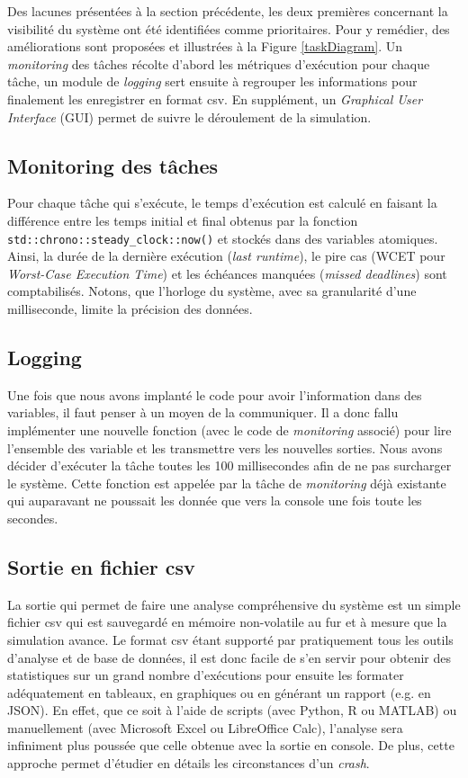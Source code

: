 \documentclass[journal]{IEEEtran}
\begin{document}
Des lacunes présentées à la section précédente, les deux premières concernant la visibilité du système ont été identifiées comme prioritaires. 
Pour y remédier, des améliorations sont proposées et illustrées à la Figure \ref{taskDiagram}. Un \textit{monitoring} des tâches récolte d'abord les métriques d'exécution pour chaque tâche, un module de \textit{logging} sert ensuite à regrouper les informations pour finalement les enregistrer en format csv. En supplément, un \textit{Graphical User Interface} (GUI) permet de suivre le déroulement de la simulation.

\subsection{Monitoring des tâches}

Pour chaque tâche qui s'exécute, le temps d'exécution est calculé en faisant la différence entre les temps initial et final obtenus par la fonction \verb|std::chrono::steady_clock::now()| et stockés dans des variables atomiques. Ainsi, la durée de la dernière exécution (\textit{last runtime}), le pire cas (WCET pour \textit{Worst-Case Execution Time}) et les échéances manquées (\textit{missed deadlines}) sont comptabilisés. Notons, que l'horloge du système, avec sa granularité d'une milliseconde, limite la précision des données.

\subsection{Logging}

Une fois que nous avons implanté le code pour avoir l'information dans des variables, il faut penser à un moyen de la communiquer. Il a donc fallu implémenter une nouvelle fonction (avec le code de \textit{monitoring} associé) pour lire l'ensemble des variable et les transmettre vers les nouvelles sorties. Nous avons décider d'exécuter la tâche toutes les 100 millisecondes afin de ne pas surcharger le système. Cette fonction est appelée par la tâche de \textit{monitoring} déjà existante qui auparavant ne poussait les donnée que vers la console une fois toute les secondes.

\subsection{Sortie en fichier csv}

La sortie qui permet de faire une analyse compréhensive du système est un simple fichier csv qui est sauvegardé en mémoire non-volatile au fur et à mesure que la simulation avance. Le format csv étant supporté par pratiquement tous les outils d'analyse et de base de données, il est donc facile de s'en servir pour obtenir des statistiques sur un grand nombre d'exécutions pour ensuite les formater adéquatement en tableaux, en graphiques ou en générant un rapport (e.g. en JSON). En effet, que ce soit à l'aide de scripts (avec Python, R ou MATLAB) ou manuellement (avec Microsoft Excel ou LibreOffice Calc), l'analyse sera infiniment plus poussée que celle obtenue avec la sortie en console. De plus, cette approche permet d'étudier en détails les circonstances d'un \textit{crash}.
 
\end{document}
